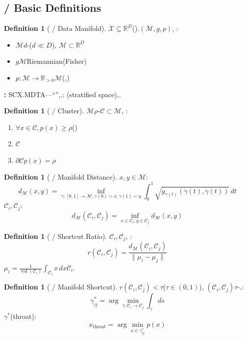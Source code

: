 \documentclass[11pt,a4paper]{article}
\theoremstyle{plain}
\theoremstyle{definition}
\newtheorem{definition}[theorem]{Definition}
\theoremstyle{remark}
\newcommand{\RR}{\mathbb{R}}
\newcommand{\cM}{\mathcal{M}}
\newcommand{\cX}{\mathcal{X}}
\newcommand{\cC}{\mathcal{C}}
\DeclareMathOperator{\vol}{vol}
\begin{document}
{\subsection{ / Basic Definitions}
\begin{definition}[ / Data Manifold]
\label{def:data-manifold}
$\cX \subseteq \RR^D$().$(\cM, g, p)$, : 
\begin{itemize}
 \item $\cM$$d$-($d \ll D$), $\cM \subset \RR^D$
 \item $g$$\cM$Riemannian(Fisher)
 \item $p: \cM \to \RR_{>0}$$\cM$(,)
\end{itemize}
\textbf{: } SCX.MDTA---``'',.: (stratified space),.
\end{definition}
\begin{definition}[ / Cluster]
\label{def:cluster}
$\cM$$\rho$-$\cC \subset \cM$, : 
\begin{enumerate}[leftmargin=*, label=(\arabic*)]
 \item $\forall x \in \cC, p(x) \geq \rho$()
 \item $\cC$
 \item $\partial\cC$$p(x) = \rho$
\end{enumerate}
\end{definition}
\begin{definition}[ / Manifold Distance]
\label{def:manifold-dist}
$x, y \in \cM$: 
\begin{equation}
 d_{\cM}(x, y) = \inf_{\gamma: [0,1] \to \cM, \gamma(0)=x, \gamma(1)=y} \int_0^1 \sqrt{g_{\gamma(t)}(\dot{\gamma}(t), \dot{\gamma}(t))} \, dt
\end{equation}
$\cC_i, \cC_j$: 
\begin{equation}
 d_{\cM}(\cC_i, \cC_j) = \inf_{x \in \cC_i, y \in \cC_j} d_{\cM}(x, y)
\end{equation}
\end{definition}
\begin{definition}[ / Shortcut Ratio]
\label{def:shortcut-ratio}
$\cC_i, \cC_j$, : 
\begin{equation}
 \boxed{r(\cC_i, \cC_j) = \frac{d_{\cM}(\cC_i, \cC_j)}{\|\mu_i - \mu_j\|}}
\end{equation}
$\mu_i = \frac{1}{\vol(\cC_i)} \int_{\cC_i} x \, dx$$\cC_i$.
\end{definition}
\begin{definition}[ / Manifold Shortcut]
\label{def:shortcut}
$r(\cC_i, \cC_j) < \tau$($\tau \in (0, 1)$), $(\cC_i, \cC_j)$$\tau$-.: 
\begin{equation}
 \gamma^*_{ij} = \arg\min_{\gamma: \cC_i \to \cC_j} \int_\gamma ds
\end{equation}
$\gamma^*$(throat): 
\begin{equation}
 x_{\text{throat}} = \arg\min_{x \in \gamma^*_{ij}} p(x)
\end{equation}
\end{definition}
}
\end{document}
